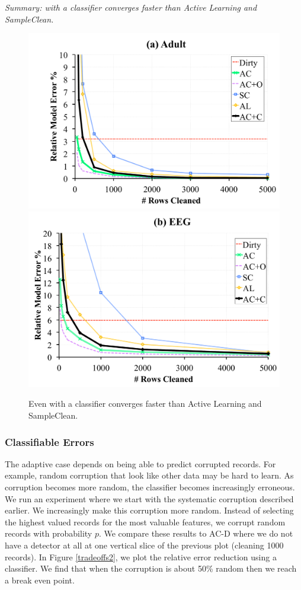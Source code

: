 \noindent \emph{Summary: \sys with a classifier converges faster than Active Learning and SampleClean.}

\begin{figure}[t]
\centering
 \includegraphics[width=0.49\columnwidth]{exp/exp11a.pdf}
 \includegraphics[width=0.49\columnwidth]{exp/exp11b.pdf}
 \caption{Even with a classifier \sys converges faster than Active Learning and SampleClean. \label{pred-perf}}
\end{figure}

\subsubsection{Classifiable Errors}
The adaptive case depends on being able to predict corrupted records.
For example, random corruption that look like other data may be hard to learn.
As corruption becomes more random, the classifier becomes increasingly erroneous.
We run an experiment where we start with the systematic corruption described earlier.
We increasingly make this corruption more random.
Instead of selecting the highest valued records for the most valuable features, we corrupt random records with probability $p$. 
We compare these results to AC-D where we do not have a detector at all at one vertical slice of the previous plot (cleaning 1000 records).
In Figure \ref{tradeoffs2}, we plot the relative error reduction using a classifier.
We find that when the corruption is about 50\% random then we reach a break even point.

\vspace{0.25em}


